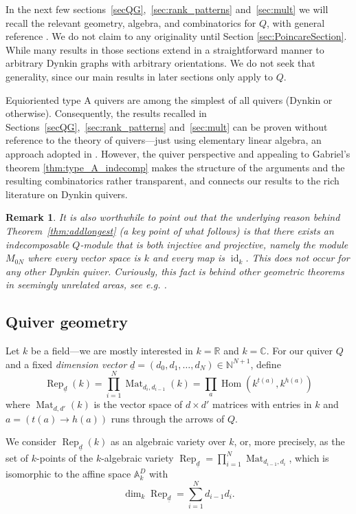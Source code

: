 \documentclass[a4paper]{amsart}
\DeclareMathOperator{\id}{id}
\DeclareMathOperator{\Hom}{Hom}
\DeclareMathOperator{\Rep}{\mathrm{Rep}}
\DeclareMathOperator{\Mat}{\mathrm{Mat}}
\newcommand{\R}{\mathbb{R}}
\newcommand{\C}{\mathbb{C}}
\newcommand{\N}{\mathbb{N}}
\newcommand{\A}{\mathbb{A}}
\newcommand{\ud}{\underline{d}}
\theoremstyle{plain}
\newtheorem{remark}[thm]{Remark}
\begin{document}
In the next few sections~\ref{secQG},~\ref{sec:rank_patterns} and~\ref{sec:mult} we will recall the relevant geometry, algebra, and combinatorics for $Q$, with general reference \cite[Ch.~1-3]{kirillov}. We do not claim to any originality until Section \ref{sec:PoincareSection}. While many results in those sections extend in a straightforward manner to arbitrary Dynkin graphs with arbitrary orientations. We do not seek that generality, since our main results in later sections only apply to $Q$. %

Equioriented type A quivers are among the simplest of all quivers (Dynkin or otherwise). Consequently, the results recalled in Sections~\ref{secQG},~\ref{sec:rank_patterns} and~\ref{sec:mult} can be proven without reference to the theory of quivers---just using elementary linear algebra, an approach adopted in \cite{bhattacharya-shewchuk}. However, the quiver perspective and appealing to Gabriel's theorem \ref{thm:type_A_indecomp} makes the structure of the arguments and the resulting combinatorics rather transparent, and connects our results to the rich literature on Dynkin quivers.

\begin{remark} \rm
    It is also worthwhile to point out that the underlying reason behind Theorem~\ref{thm:addlongest} (a key point of what follows) is that there exists an indecomposable $Q$-module that is {\em both injective and projective}, namely the module $M_{0N}$ where every vector space is $k$ and every map is $\id_k$. This does not occur for any other Dynkin quiver. Curiously, this fact is behind other geometric theorems in seemingly unrelated areas, see e.g. \cite[Rem. 4.6]{FRduke}. 
\end{remark}

\subsection{Quiver geometry}

Let $k$ be a field---we are mostly interested in $k=\R$ and $k=\C$. For our quiver $Q$ and a fixed \emph{dimension vector} $\ud=(d_0,d_1,\ldots,d_N)\in \N^{N+1}$, define 
\[
\Rep_{\ud}(k)=\prod_{i=1}^{N}\Mat_{d_{i},d_{i-1}}(k)
=
\prod_{a} \Hom(k^{t(a)},k^{h(a)})
\]
where $\Mat_{d,d'}(k)$ is the vector space of  $d\times d'$ matrices with entries in $k$ and $a=(t(a)\to h(a))$ runs through the arrows of $Q$. 

We consider $\Rep_{\ud}(k)$ as an algebraic variety over $k$, or, more precisely, as the set of $k$-points of the $k$-algebraic variety $\Rep_{\ud}=\prod_{i=1}^{N}\Mat_{d_{i-1},d_i}$, which is isomorphic to the affine space $\A^D_k$ with 
\begin{equation}\label{eq:dim_Rep}
   \dim_k \Rep_{\ud} =\sum_{i=1}^N d_{i-1}d_i. 
\end{equation}
\end{document}
